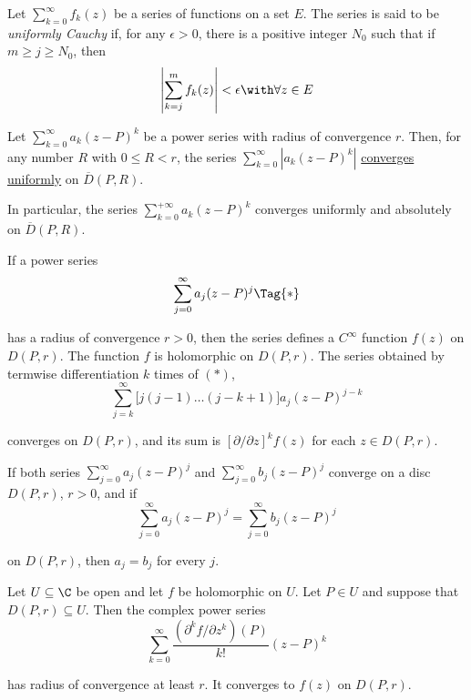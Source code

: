 \label{bfe260e}

Let $\sum_{k=0}^\infty f_k(z)$ be a series of functions on a set $E$. The
series is said to be \textit{uniformly Cauchy} if, for any $\epsilon>0$, there
is a positive integer $N_0$ such that if $m\geq j\geq N_0$, then
$$
  \left|\sum_{k=j}^mf_k(z)\right|<\epsilon\with\forall z\in E
$$

\label{ec076c1}

Let $\sum_{k=0}^\infty a_k(z-P)^k$ be a power series with radius of convergence
$r$. Then, for any number $R$ with $0\leq R<r$, the series
$\sum_{k=0}^\infty|a_k(z-P)^k|$ \href{bba67e4}{converges uniformly} on
$\overline D(P,R)$.

In particular, the series $\sum_{k=0}^{+\infty}a_k(z-P)^k$ converges uniformly
and absolutely on $\overline D(P,R)$.

\label{ccf2595}

If a power series
\begin{equation*}
  \sum_{j=0}^\infty a_j(z-P)^j\Tag{*}
\end{equation*}

has a radius of convergence $r>0$, then the series defines a $C^\infty$
function $f(z)$ on $D(P,r)$. The function $f$ is holomorphic on $D(P,r)$. The
series obtained by termwise differentiation $k$ times of $(*)$,
$$
  \sum_{j=k}^\infty\Big[j(j-1)\ldots(j-k+1)\Big]a_j(z-P)^{j-k}
$$

converges on $D(P,r)$, and its sum is $[\partial/\partial z]^kf(z)$ for each
$z\in D(P,r)$.

\label{ea8c930}

If both series $\sum_{j=0}^\infty a_j(z-P)^j$ and $\sum_{j=0}^\infty
b_j(z-P)^j$ converge on a disc $D(P,r)$, $r>0$, and if
$$
  \sum_{j=0}^\infty a_j(z-P)^j=\sum_{j=0}^\infty b_j(z-P)^j
$$

on $D(P,r)$, then $a_j=b_j$ for every $j$.

\label{b43209d}

Let $U\subseteq\C$ be open and let $f$ be holomorphic on $U$. Let $P\in U$ and
suppose that $D(P,r)\subseteq U$. Then the complex power series
$$
  \sum_{k=0}^\infty\frac{(\partial^kf/\partial z^k)(P)}{k!}(z-P)^k
$$

has radius of convergence at least $r$. It converges to $f(z)$ on $D(P,r)$.

\label{a2d8611}

